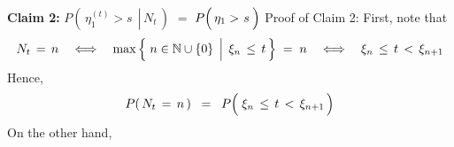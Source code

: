 \vskip 0.5cm
\noindent
\textbf{Claim 2:}\quad
$P\!\left(\,\left.\eta^{(t)}_{1} > s \;\,\right\vert\, N_{t}\,\right)$\;
$=$
\;$P\!\left(\,\eta_{1} > \overset{{\color{white}-}}{s}\,\right)$
\vskip 0.2cm
\noindent
Proof of Claim 2:\quad
First, note that
\begin{equation*}
N_{t}\,=\,n
\quad\Longleftrightarrow\quad
	\max\left\{\,\left.
	n \overset{{\color{white}.}}{\in} \N\cup\{0\}
	\,\;\right\vert\;
	\xi_{n} \,\leq\, t
	\,\right\}
	\;=\; n
\quad\Longleftrightarrow\quad
	\xi_{n} \,\overset{{\color{white}.}}{\leq}\, t \,<\, \xi_{n+1}
\end{equation*}
Hence,
\begin{equation*}
P(\,N_{t}\,=\,n\,)
\;\; = \;\;
	P\!\left(\; \xi_{n} \,\overset{{\color{white}.}}{\leq}\, t \,<\, \xi_{n+1} \,\right)
\end{equation*}
On the other hand,
